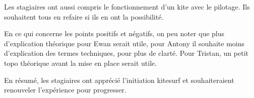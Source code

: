\documentclass[11pt,a4paper]{report}
\begin{document}
Les stagiaires ont aussi compris le fonctionnement d'un kite avec le pilotage.
Ils souhaitent tous en refaire si ils en ont la possibilité.

En ce qui concerne les points positifs et négatifs, on peu noter
que plus d'explication théorique pour Ewan serait utile, pour Antony
il souhaite moins d'explication des termes techniques, pour plus de clarté.
Pour Tristan, un petit topo théorique avant la mise en place serait utile.

En résumé, les stagiaires ont apprécié l'initiation kitesurf et
souhaiteraient renouveler l'expérience pour progresser.
\end{document}
